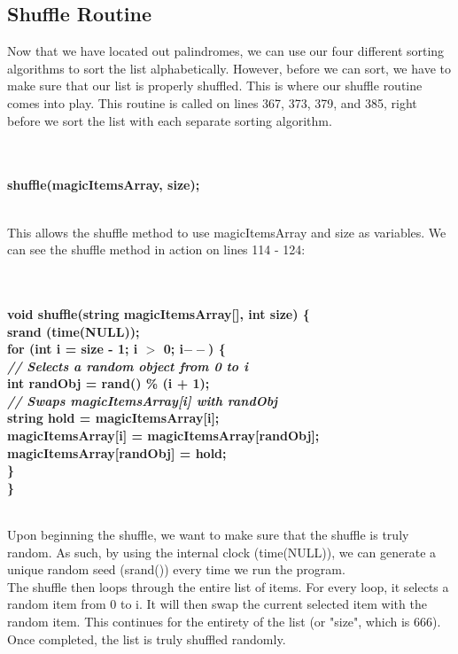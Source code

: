 \documentclass{article}
\begin{document}
\subsection{Shuffle Routine}
Now that we have located out palindromes, we can use our four different sorting algorithms to sort the list alphabetically. However, before we can sort, we have to make sure that our list is properly shuffled. This is where our shuffle routine comes into play. This routine is called on lines 367, 373, 379, and 385, right before we sort the list with each separate sorting algorithm. 

\textbf{
\\~\\
\indent shuffle(magicItemsArray, size);\\~\\ }

This allows the shuffle method to use magicItemsArray and size as variables. We can see the shuffle method in action on lines 114 - 124:

\textbf{
\\~\\
void shuffle(string magicItemsArray[], int size) \{\\
    \indent srand (time(NULL));\\
    \indent for (int i = size - 1; i $>$ 0; i$--$) \{\\
        \textit{ \indent \indent // Selects a random object from 0 to i\\ }
        \indent \indent int randObj = rand() \% (i + 1);\\
        \textit{ \indent \indent // Swaps magicItemsArray[i] with randObj\\ }
        \indent \indent string hold = magicItemsArray[i];\\
        \indent \indent magicItemsArray[i] = magicItemsArray[randObj];\\
        \indent \indent magicItemsArray[randObj] = hold;\\
    \indent \}\\
\}\\~\\ }

Upon beginning the shuffle, we want to make sure that the shuffle is truly random. As such, by using the internal clock (time(NULL)), we can generate a unique random seed (srand()) every time we run the program. \\
The shuffle then loops through the entire list of items. For every loop, it selects a random item from 0 to i. It will then swap the current selected item with the random item. This continues for the entirety of the list (or "size", which is 666). Once completed, the list is truly shuffled randomly.
\end{document}
